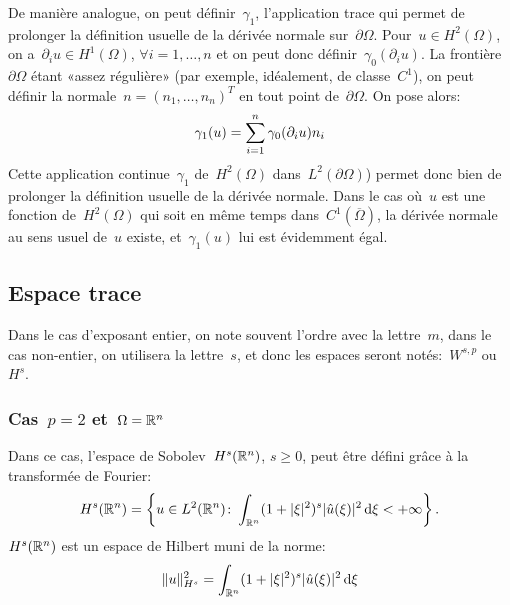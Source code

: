 \medskip
De manière analogue, on peut définir~$\gamma_1$, l'application trace qui permet de prolonger la définition usuelle de la dérivée normale sur~$\partial\Omega$.
Pour~$u\in H^2(\Omega)$, on a~$\partial_iu\in H^1(\Omega)$, $\forall i=1,\ldots,n$ et on peut donc définir~$\gamma_0(\partial_iu)$. La frontière~$\partial\Omega$ étant «assez régulière» (par exemple, idéalement, de classe~$C^1$), on peut définir la normale~$n = (n_1,\ldots,n_n)^T$ en tout point de~$\partial\Omega$.
On pose alors:
\begin{equation}\gamma_1(u) = \displaystyle\sum_{i=1}^n \gamma_0(\partial_iu)n_i\end{equation}
Cette application continue~$\gamma_1$ de~$H^2(\Omega)$ dans~$L^2(\partial\Omega)$) permet donc bien de prolonger la définition usuelle de la dérivée normale.
Dans le cas où~$u$ est une fonction de~$H^2(\Omega)$ qui soit en même temps dans~$C^1(\overline{\Omega})$, la dérivée normale au sens usuel de~$u$ existe, et~$\gamma_1(u)$ lui est évidemment égal.

\medskip
\subsection{Espace trace}

%
Dans le cas d'exposant entier, on note souvent l'ordre avec la lettre~$m$, dans le cas non-entier, on utilisera la lettre~$s$, et donc les espaces seront notés:~$W^{s,p}$ ou~$H^s$.

\medskip
\subsubsection{Cas~$p=2$ et~$\Omega=\mathbb R^{n}$}

Dans ce cas, l'espace de Sobolev~$H^{s}(\mathbb R^n)$, $s\geqslant 0$, peut être défini grâce à la transformée de Fourier:
\begin{equation}
H^{s} (\mathbb R^n) = \left\{ u \in L^{2}(\mathbb R^n) \colon \int_{\mathbb R^n} ( 1 + | \xi |^{2} )^{s} | \hat{u} (\xi) |^{2} \, \text{d}\xi < + \infty \right\}.
\end{equation}
$H^{s}(\mathbb R^n)$ est un espace de Hilbert muni de la norme:
\begin{equation}\| u \|_{H^{s}}^{2} = \int_{\mathbb R^n} ( 1 + | \xi |^{2} )^{s} | \hat{u} (\xi) |^{2} \, \text{d}\xi \end{equation}

